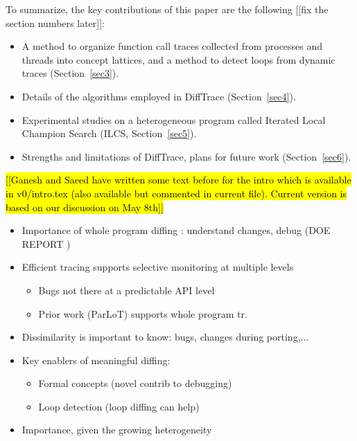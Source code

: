 \noindent To summarize, the key contributions of this paper are the following [[fix the section numbers
later]]:

\begin{itemize}
\item A method to organize function call traces collected from processes and
      threads into concept lattices, and a method to
      detect loops from dynamic traces (Section~\ref{sec3}).

\item Details of the algorithms employed in DiffTrace (Section~\ref{sec4}).

\item Experimental studies on a heterogeneous program called
      Iterated Local Champion Search (ILCS, Section~\ref{sec5}).

\item Strengths and limitations of DiffTrace, plans for future work (Section~\ref{sec6}).
\end{itemize}




\hl{[[Ganesh and Saeed have written some text before for the intro which is available in v0/intro.tex (also available but commented in current file). Current version is based on our discussion on May 8th]]}

\begin{itemize}
	\item Importance of whole program diffing : understand changes, debug (DOE REPORT \cite{hpcdoe})
	\item Efficient tracing supports selective monitoring at multiple levels
	\begin{itemize}
		\item Bugs not there at a predictable API level
		\item Prior work (ParLoT) supports whole program tr.
	\end{itemize}
	\item Dissimilarity is important to know: bugs, changes during porting,...
	\item Key enablers of meaningful diffing:
	\begin{itemize}
		\item Formal concepts (novel contrib to debugging)
		\item Loop detection (loop diffing can help)
	\end{itemize}
	\item Importance, given the growing heterogeneity
\end{itemize}


